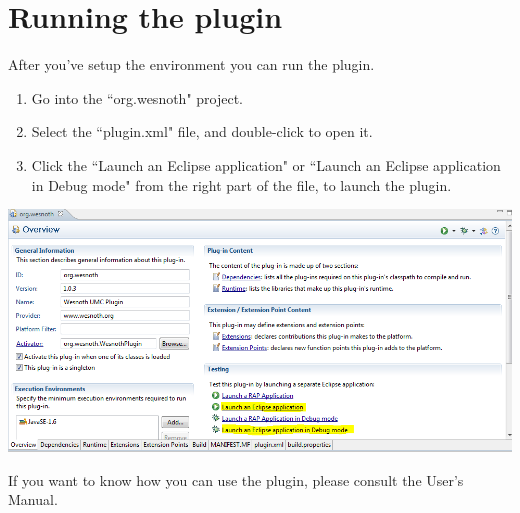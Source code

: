 \documentclass[10pt]{article}
\begin{document}
\section{Running the plugin}
After you've setup the environment you can run the plugin.
\begin{enumerate}
	\item Go into the ``org.wesnoth" project.
	\item Select the ``plugin.xml" file, and double-click to open it.
	\item Click the ``Launch an Eclipse application" or ``Launch an Eclipse application in Debug mode" from the right part of the file, to launch the plugin.
\end{enumerate}
\begin{center}
	\includegraphics[scale=0.6]{launch_plugin.png}
\end{center}

If you want to know how you can use the plugin, please consult the User's Manual.
\end{document}
